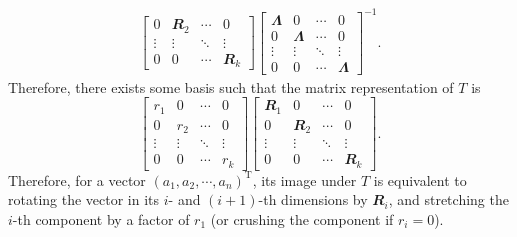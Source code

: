 \documentclass[math]{amznotes}
\theoremstyle{remark}
\begin{document}
\begin{align*}
\begin{bmatrix}
        0 & \mathbfit{R}_2 & \cdots & 0 \\
        \vdots & \vdots & \ddots & \vdots \\
        0 & 0 & \cdots & \mathbfit{R}_k
    \end{bmatrix}\begin{bmatrix}
        \mathbfit{\Lambda} & 0 & \cdots & 0 \\
        0 & \mathbfit{\Lambda} & \cdots & 0 \\  
        \vdots & \vdots & \ddots & \vdots \\
        0 & 0 & \cdots & \mathbfit{\Lambda}
    \end{bmatrix}^{-1}.
\end{align*}
Therefore, there exists some basis such that the matrix representation of $T$ is 
\begin{equation*}
    \begin{bmatrix}
        r_1 & 0 & \cdots & 0 \\
        0 & r_2 & \cdots & 0 \\
        \vdots & \vdots & \ddots & \vdots \\
        0 & 0 & \cdots & r_k
    \end{bmatrix}\begin{bmatrix}
        \mathbfit{R}_1 & 0 & \cdots & 0 \\
        0 & \mathbfit{R}_2 & \cdots & 0 \\
        \vdots & \vdots & \ddots & \vdots \\
        0 & 0 & \cdots & \mathbfit{R}_k
    \end{bmatrix}.
\end{equation*}
Therefore, for a vector $(a_1, a_2, \cdots, a_n)^{\mathrm{T}}$, its image under $T$ is equivalent to rotating the vector in its $i$- and $(i + 1)$-th dimensions by $\mathbfit{R}_i$, and stretching the $i$-th component by a factor of $r_1$ (or crushing the component if $r_i = 0$).
\end{document}
